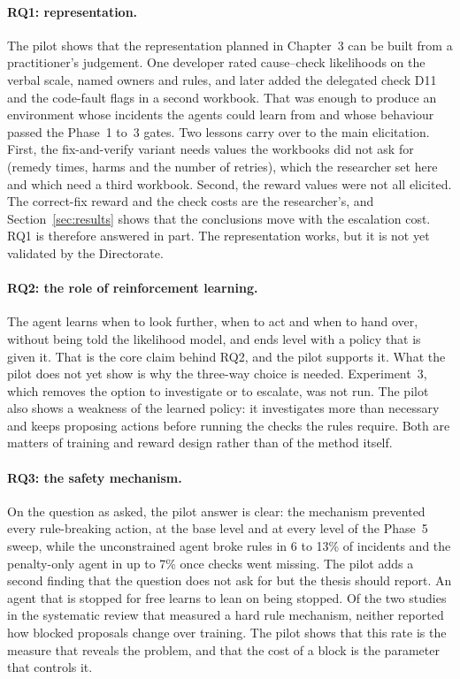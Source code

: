 \documentclass[11pt,a4paper]{article}
\begin{document}
\paragraph{RQ1: representation.} The pilot shows that the representation planned in Chapter~3 can be built from a practitioner's judgement. One developer rated cause--check likelihoods on the verbal scale, named owners and rules, and later added the delegated check D11 and the code-fault flags in a second workbook. That was enough to produce an environment whose incidents the agents could learn from and whose behaviour passed the Phase~1 to~3 gates. Two lessons carry over to the main elicitation. First, the fix-and-verify variant needs values the workbooks did not ask for (remedy times, harms and the number of retries), which the researcher set here and which need a third workbook. Second, the reward values were not all elicited. The correct-fix reward and the check costs are the researcher's, and Section~\ref{sec:results} shows that the conclusions move with the escalation cost. RQ1 is therefore answered in part. The representation works, but it is not yet validated by the Directorate.

\paragraph{RQ2: the role of reinforcement learning.} The agent learns when to look further, when to act and when to hand over, without being told the likelihood model, and ends level with a policy that is given it. That is the core claim behind RQ2, and the pilot supports it. What the pilot does not yet show is why the three-way choice is needed. Experiment~3, which removes the option to investigate or to escalate, was not run. The pilot also shows a weakness of the learned policy: it investigates more than necessary and keeps proposing actions before running the checks the rules require. Both are matters of training and reward design rather than of the method itself.

\paragraph{RQ3: the safety mechanism.} On the question as asked, the pilot answer is clear: the mechanism prevented every rule-breaking action, at the base level and at every level of the Phase~5 sweep, while the unconstrained agent broke rules in 6 to 13\% of incidents and the penalty-only agent in up to 7\% once checks went missing. The pilot adds a second finding that the question does not ask for but the thesis should report. An agent that is stopped for free learns to lean on being stopped. Of the two studies in the systematic review that measured a hard rule mechanism, neither reported how blocked proposals change over training. The pilot shows that this rate is the measure that reveals the problem, and that the cost of a block is the parameter that controls it.
\end{document}

